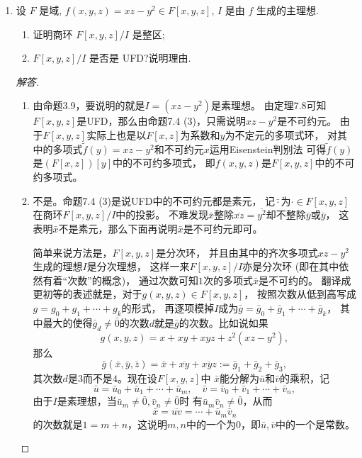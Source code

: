 \begin{enumerate}
\item 设 $ F $ 是域, $ f(x, y, z) = xz - y^2 \in F[x, y, z] $, $ I $ 是由 $ f $ 生成的主理想.
\begin{enumerate}[label=(\arabic*)]
    \item 证明商环 $ F[x, y, z]/I $ 是整区;
    \item $ F[x, y, z]/I $ 是否是 UFD?说明理由.
\end{enumerate}
\begin{proof}[解答]
    \begin{enumerate}[label=(\arabic*)]
    \item 由命题3.9，要说明的就是$I=(xz-y^2)$是素理想。
    由定理7.8可知$F[x,y,z]$是UFD，那么由命题7.4 (3)，只需说明$xz-y^2$是不可约元。
    由于$F[x,y,z]$实际上也是以$F[x,z]$为系数和$y$为不定元的多项式环，
    对其中的多项式$\tilde{f}(y)=xz-y^2$和不可约元$x$运用Eisenstein判别法
    可得$\tilde{f}(y)$是$(F[x,z])[y]$中的不可约多项式，
    即$f(x,y,z)$是$F[x,y,z]$中的不可约多项式。
    \item 不是。命题7.4 (3)是说UFD中的不可约元都是素元，
    记$\bar{\cdot}$为$\cdot \in F[x,y,z]$在商环$F[x,y,z]/I$中的投影。
    不难发现$\bar{x}$整除$\overline{xz}=\overline{y^2}$却不整除$\bar{y}$或$\bar{y}$，
    这表明$\bar{x}$不是素元，那么下面再说明$\bar{x}$是不可约元即可。

    简单来说方法是，$F[x,y,z]$是分次环，
    并且由其中的齐次多项式$xz-y^2$生成的理想$I$是分次理想，
    这样一来$F[x,y,z]/I$亦是分次环 (即在其中依然有着``次数''的概念)，
    通过次数可知$1$次的多项式$\bar{x}$是不可约的。
    翻译成更初等的表述就是，对于$g(x,y,z) \in F[x,y,z]$，
    按照次数从低到高写成$g=g_0+g_1+\cdots+g_k$的形式，
    再逐项模掉$I$成为$\bar{g}=\bar{g}_0+\bar{g}_1+\cdots+\bar{g}_k$，
    其中最大的使得$\bar{g}_d\ne\bar{0}$的次数$d$就是$\bar{g}$的次数。比如说如果
    \[g(x,y,z)=x+xy+xyz+z^2(xz-y^2),\]
    那么
    \[\bar{g}(\bar{x},\bar{y},\bar{z})=\bar{x}+\overline{xy}+\overline{xyz}
    :=\bar{g}_1+\bar{g}_2+\bar{g}_3,\]
    其次数$d$是$3$而不是$4$。现在设$F[x,y,z]$中
    $\bar{x}$能分解为$\bar{u}$和$\bar{v}$的乘积，记
    \[\bar{u}=\bar{u}_0+\bar{u}_1+\cdots+\bar{u}_m,
    \quad\bar{v}=\bar{v}_0+\bar{v}_1+\cdots+\bar{v}_n,\]
    由于$I$是素理想，当$\bar{u}_m\ne\bar{0},\bar{v}_n\ne\bar{0}$时
    有$\bar{u}_m\bar{v}_n\ne\bar{0}$，从而
    \[\bar{x}=\overline{uv}=\cdots+\bar{u}_m\bar{v}_n\]
    的次数就是$1=m+n$，这说明$m,n$中的一个为$0$，即$\bar{u},\bar{v}$中的一个是常数。\qedhere
    \end{enumerate}
\end{proof}


\end{enumerate}
